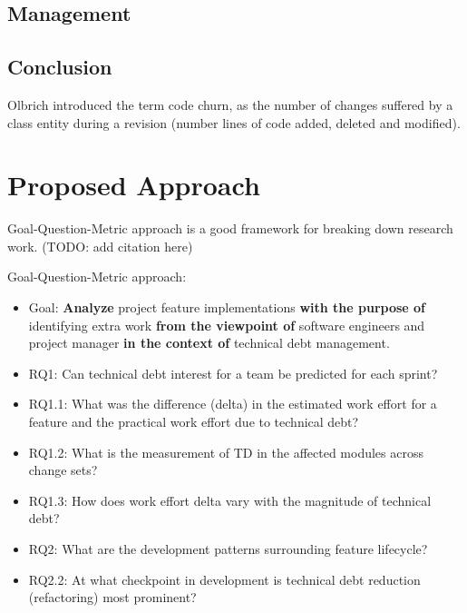 \documentclass{mprop}
\begin{document}
\subsection{Management}


\subsection{Conclusion}

Olbrich \cite{Olbrich2009} introduced the term code churn, as the number of
changes suffered by a class entity during a revision (number lines of code
added, deleted and modified).


\section{Proposed Approach}

Goal-Question-Metric approach is a good framework for breaking down research
work. (TODO: add citation here)

Goal-Question-Metric approach:
\begin{itemize}
	\item Goal: \textbf{Analyze} project feature implementations \textbf{with
	the purpose of} identifying extra work \textbf{from the viewpoint of}
	software engineers and project manager \textbf{in the context of}
	technical debt management.
	\item RQ1: Can technical debt interest for a team be predicted for each
	sprint?
	\item RQ1.1: What was the difference (delta) in the estimated work effort
	for a feature and the practical work effort due to technical debt?
	\item RQ1.2: What is the measurement of TD in the affected modules across
	change sets?
	\item RQ1.3: How does work effort delta vary with the magnitude of
	technical debt?
	\item RQ2: What are the development patterns surrounding feature
	lifecycle?
	\item RQ2.2: At what checkpoint in development is technical debt reduction
	(refactoring)  most prominent?
\end{itemize}
\end{document}
